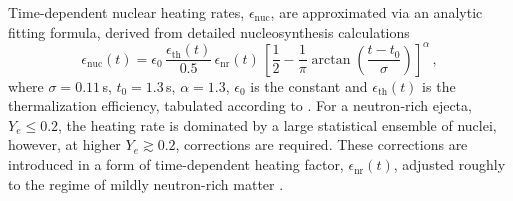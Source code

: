 
Time-dependent nuclear heating rates, $\epsilon_{\text{nuc}}$, 
are approximated via an analytic fitting formula, derived from detailed 
nucleosynthesis calculations~\citep{Korobkin:2012uy}  
%
\begin{equation}
\label{eq:kilonova:eps_korob}
\epsilon_{\text{nuc}}(t)= \epsilon_0 \, \frac{\epsilon_{\text{th}}(t)}{0.5} \, \epsilon_{\text{nr}}(t) \,
\left[ \frac{1}{2} - \frac{1}{\pi} \arctan\left(\frac{t-t_0}{\sigma}\right)\right]^{\alpha}\,,
\end{equation}
%
where $\sigma = 0.11\,$s, $t_0 = 1.3\,$s, $\alpha=1.3$,
$\epsilon_0$ is the constant and 
$\epsilon_{\text{th}}(t)$ is the 
thermalization efficiency, tabulated according to \citet{Barnes:2016umi}.
%
For a neutron-rich ejecta, $Y_e\leq 0.2$, the heating rate is dominated by a large statistical 
ensemble of nuclei, however, at higher $Y_e\gtrsim 0.2$, corrections are required. 
%
These corrections are introduced in a form of time-dependent heating factor, 
$\epsilon_{\text{nr}}(t)$, adjusted 
roughly to the regime of mildly neutron-rich matter \citep{Perego:2017wtu}. 

%

